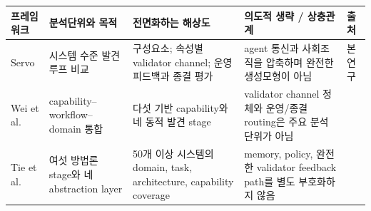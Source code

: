 \begin{tabular}{p{}p{}p{}p{}p{}}
\toprule
프레임워크 & 분석단위와 목적 & 전면화하는 해상도 & 의도적 생략 / 상충관계 & 출처 \\
\midrule
Servo & 시스템 수준 발견 루프 비교 & 구성요소; 속성별 validator channel; 운영 피드백과 종결 평가 & agent 통신과 사회조직을 압축하며 완전한 생성모형이 아님 & 본 연구 \\
Wei et al. & capability--workflow--domain 통합 & 다섯 기반 capability와 네 동적 발견 stage & validator channel 정체와 운영/종결 routing은 주요 분석단위가 아님 & \citet{wei2025agenticscience} \\
Tie et al. & 여섯 방법론 stage와 네 abstraction layer & 50개 이상 시스템의 domain, task, architecture, capability coverage & memory, policy, 완전한 validator feedback path를 별도 부호화하지 않음 & \citet{tie2025survey} \\
\bottomrule
\end{tabular}
